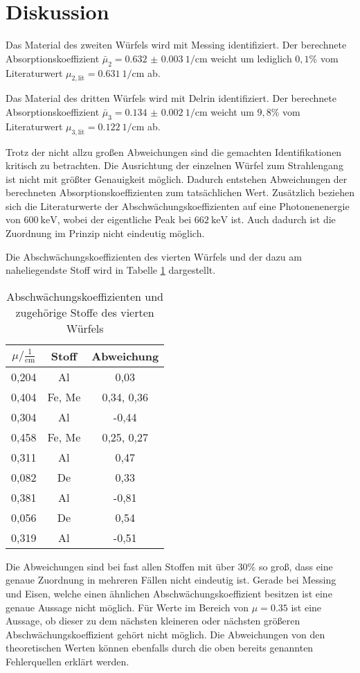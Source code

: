 \section{Diskussion}
\label{sec:Diskussion}
Das Material des zweiten Würfels wird mit Messing identifiziert. Der berechnete
Absorptionskoeffizient $\bar\mu_2 = \SI{0.632(3)}{1\per\centi\meter}$ weicht um
lediglich $0,1$\% vom Literaturwert $\mu_{2, \mathrm{ lit}} = \SI{0.631}{1\per\centi\meter}$
ab.

Das Material des dritten Würfels wird mit Delrin identifiziert. Der berechnete
Absorptionskoeffizient $\bar\mu_3 = \SI{0.134(2)}{1\per\centi\meter}$ weicht um
$9,8$\% vom Literaturwert $\mu_{3, \mathrm{ lit}} = \SI{0.122}{1\per\centi\meter}$
ab.

Trotz der nicht allzu großen Abweichungen sind die gemachten Identifikationen
kritisch zu betrachten. Die Ausrichtung der einzelnen Würfel zum Strahlengang
ist nicht mit größter Genauigkeit möglich. Dadurch entstehen Abweichungen der
berechneten Absorptionskoeffizienten zum tatsächlichen Wert.
Zusätzlich beziehen sich die Literaturwerte der Abschwächungskoeffizienten auf
eine Photonenenergie von $\SI{600}{\kilo\eV}$, wobei der eigentliche Peak
bei $\SI{662}{\kilo\eV}$ ist. Auch dadurch ist die Zuordnung im Prinzip nicht
eindeutig möglich.

Die Abschwächungskoeffizienten des vierten Würfels und der dazu am naheliegendste Stoff wird in
Tabelle \ref{tab:abw} dargestellt.

\begin{table}[H]
  \centering
  \caption{Abschwächungskoeffizienten und zugehörige Stoffe des vierten Würfels}
  \label{tab:abw}
  \begin{tabular}{c c c}
    \toprule
    $\mu/ \mathrm{\frac{1}{cm}}$ & Stoff & Abweichung   \\
    \midrule
    0,204      &  Al     &   0,03    \\
    0,404      &  Fe, Me &   0,34, 0,36    \\
    0,304      &  Al     &  -0,44    \\
    0,458      &  Fe, Me &   0,25, 0,27    \\
    0,311      &  Al     &   0,47    \\
    0,082      &  De     &   0,33    \\
    0,381      &  Al     &  -0,81    \\
    0,056      &  De     &   0,54   \\
    0,319      &  Al     &  -0,51  \\
    \bottomrule
  \end{tabular}
\end{table}

Die Abweichungen sind bei fast allen Stoffen mit über $30\%$ so groß, dass
eine genaue Zuordnung in mehreren Fällen nicht eindeutig ist. Gerade bei Messing und
Eisen, welche einen ähnlichen Abschwächungskoeffizient besitzen ist eine genaue
Aussage nicht möglich. Für Werte im Bereich von $\mu = 0.35$ ist eine Aussage, ob
dieser zu dem nächsten kleineren oder nächsten größeren Abschwächungskoeffizient
gehört nicht möglich. Die Abweichungen von den theoretischen Werten können ebenfalls durch
die oben bereits genannten Fehlerquellen erklärt werden.
